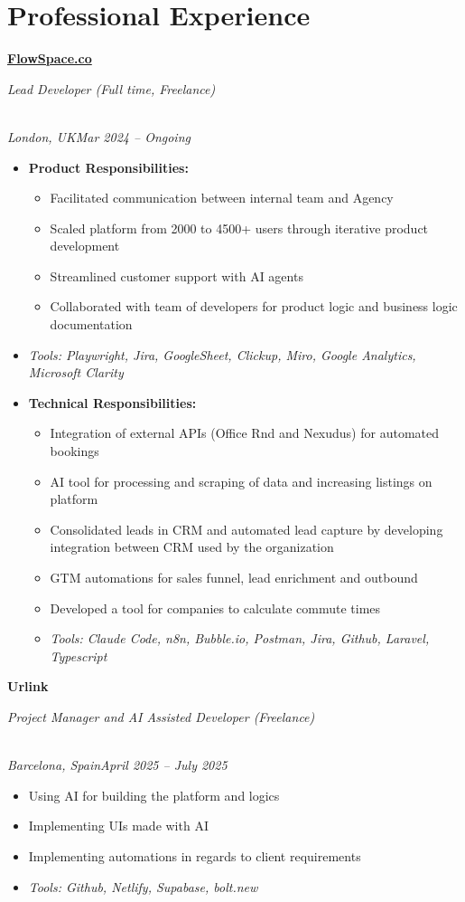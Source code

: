 \documentclass[a4paper,10pt]{article}
\newcommand{\role}[4]{\vspace{3pt}\noindent\hspace{0.6em}\parbox[t]{0.38\textwidth}{\raggedright\textbf{#1}}\hfill\parbox[t]{0.58\textwidth}{\raggedleft\textit{#2}}\\{\textit{#3}\hfill\textit{#4}}\vspace{1pt}}
\begin{document}
\section{Professional Experience}
\role{\href{https://flowspace.co}{FlowSpace.co}}{Lead Developer (Full time, Freelance)}{London, UK}{Mar 2024 -- Ongoing}
\begin{itemize}
\item \textbf{Product Responsibilities:}
\begin{itemize}[label=--]
\item Facilitated communication between internal team and Agency
\item Scaled platform from 2000 to 4500+ users through iterative product development
\item Streamlined customer support with AI agents
\item Collaborated with team of developers for product logic and business logic documentation
\end{itemize}
\item \textit{Tools: Playwright, Jira, GoogleSheet, Clickup, Miro, Google Analytics, Microsoft Clarity}
\item \textbf{Technical Responsibilities:}
\begin{itemize}[label=--]
\item Integration of external APIs (Office Rnd and Nexudus) for automated bookings
\item AI tool for processing and scraping of data and increasing listings on platform
\item Consolidated leads in CRM and automated lead capture by developing integration between CRM used by the organization
\item GTM automations for sales funnel, lead enrichment and outbound
\item Developed a tool for companies to calculate commute times
\item \textit{Tools: Claude Code, n8n, Bubble.io, Postman, Jira, Github, Laravel, Typescript}
\end{itemize}
\end{itemize}

\role{Urlink}{Project Manager and AI Assisted Developer (Freelance)}{Barcelona, Spain}{April 2025 -- July 2025}
\begin{itemize}
\item Using AI for building the platform and logics
\item Implementing UIs made with AI
\item Implementing automations in regards to client requirements
\item \textit{Tools: Github, Netlify, Supabase, bolt.new}
\end{itemize}
\end{document}
